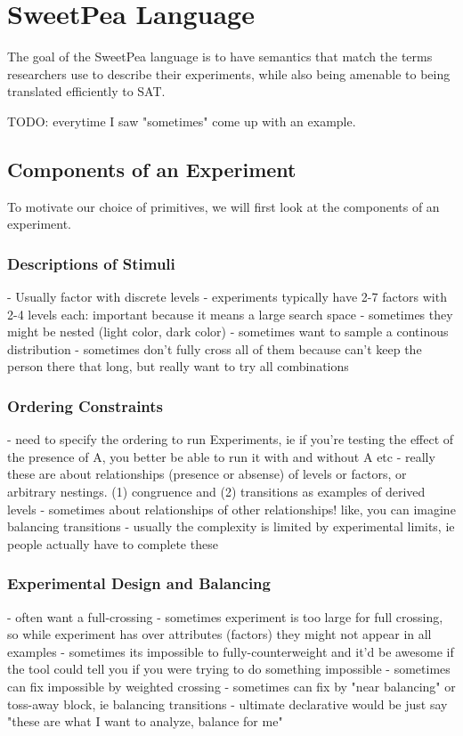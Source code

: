 
\chapter{SweetPea Language}

The goal of the SweetPea language is to have semantics that match the terms researchers use to describe their experiments, while also being amenable to being translated efficiently to SAT.

TODO: everytime I saw "sometimes" come up with an example.

\section{Components of an Experiment}

To motivate our choice of primitives, we will first look at the components of an experiment.

\subsection{Descriptions of Stimuli}
- Usually factor with discrete levels
- experiments typically have 2-7 factors with 2-4 levels each: important because it means a large search space
- sometimes they might be nested (light color, dark color)
- sometimes want to sample a continous distribution
- sometimes don't fully cross all of them because can't keep the person there that long, but really want to try all combinations

\subsection{Ordering Constraints}
- need to specify the ordering to run Experiments, ie if you're testing the effect of the presence of A, you better be able to run it with and without A etc
- really these are about relationships (presence or absense) of levels or factors, or arbitrary nestings. (1) congruence and (2) transitions as examples of derived levels
- sometimes about relationships of other relationships! like, you can imagine balancing transitions
- usually the complexity is limited by experimental limits, ie people actually have to complete these

\subsection{Experimental Design and Balancing}
- often want a full-crossing
- sometimes experiment is too large for full crossing, so while experiment has over attributes (factors) they might not appear in all examples
- sometimes its impossible to fully-counterweight and it'd be awesome if the tool could tell you if you were trying to do something impossible
- sometimes can fix impossible by weighted crossing
- sometimes can fix by "near balancing" or toss-away block, ie balancing transitions
- ultimate declarative would be just say "these are what I want to analyze, balance for me"

